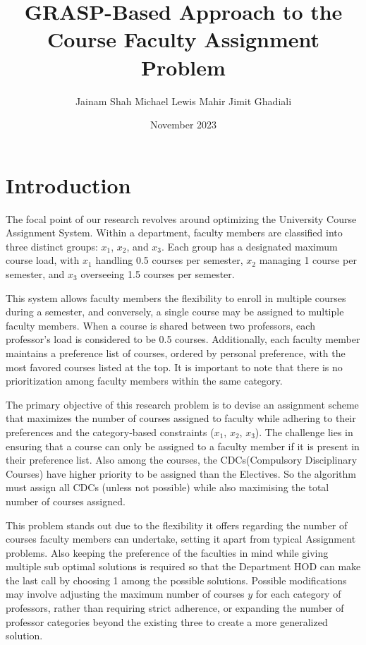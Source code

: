 \documentclass{article}
\title{GRASP-Based Approach to the Course Faculty Assignment Problem}
\author{
  \textnormal{Jainam Shah } \cdot \textnormal{ Michael Lewis } \cdot \textnormal{ Mahir Jimit Ghadiali}
}
\date{November 2023}
\begin{document}
\maketitle

\section{Introduction}
The focal point of our research revolves around optimizing the University Course Assignment System. Within a department, faculty members are classified into three distinct groups: $x_1$, $x_2$, and $x_3$. Each group has a designated maximum course load, with $x_1$ handling 0.5 courses per semester, $x_2$ managing 1 course per semester, and $x_3$ overseeing 1.5 courses per semester.
\par
This system allows faculty members the flexibility to enroll in multiple courses during a semester, and conversely, a single course may be assigned to multiple faculty members. When a course is shared between two professors, each professor's load is considered to be 0.5 courses. Additionally, each faculty member maintains a preference list of courses, ordered by personal preference, with the most favored courses listed at the top. It is important to note that there is no prioritization among faculty members within the same category.
\par
The primary objective of this research problem is to devise an assignment scheme that maximizes the number of courses assigned to faculty while adhering to their preferences and the category-based constraints ($x_1$, $x_2$, $x_3$). The challenge lies in ensuring that a course can only be assigned to a faculty member if it is present in their preference list. Also among the courses, the CDCs(Compulsory Disciplinary Courses) have higher priority to be assigned than the Electives. So the algorithm must assign all CDCs (unless not possible) while also maximising the total number of courses assigned.
\par
This problem stands out due to the flexibility it offers regarding the number of courses faculty members can undertake, setting it apart from typical Assignment problems. Also keeping the preference of the faculties in mind while giving multiple sub optimal solutions is required so that the Department HOD can make the last call by choosing 1 among the possible solutions. Possible modifications may involve adjusting the maximum number of courses $y$ for each category of professors, rather than requiring strict adherence, or expanding the number of professor categories beyond the existing three to create a more generalized solution.
\end{document}
